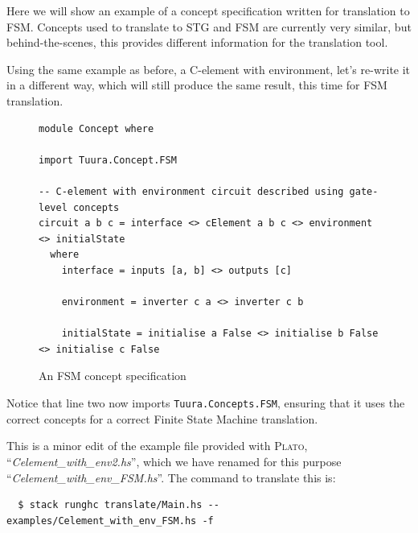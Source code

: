 \documentclass[british,technote,compsoc]{IEEEtran}
\newcommand{\noun}[1]{\textsc{#1}}
\begin{document}
Here we will show an example of a concept specification written for translation to FSM. Concepts used to translate to STG and FSM are currently very similar,
but behind-the-scenes, this provides different information for the translation tool. 

Using the same example as before, a C-element with environment, let's re-write it in a different way, which will still produce the same result, this time for FSM translation.

\begin{figure}[H]
\begin{centering}

\begin{verbatim}
module Concept where

import Tuura.Concept.FSM

-- C-element with environment circuit described using gate-level concepts
circuit a b c = interface <> cElement a b c <> environment <> initialState
  where
    interface = inputs [a, b] <> outputs [c]

    environment = inverter c a <> inverter c b

    initialState = initialise a False <> initialise b False <> initialise c False
\end{verbatim}

\par\end{centering}

\begin{centering}
\protect\caption{\label{fig:concepts_file}An FSM concept specification}

\par\end{centering}

\end{figure}

Notice that line two now imports \texttt{Tuura.Concepts.FSM}, ensuring that it uses the correct concepts for a correct Finite State Machine translation.

This is a minor edit of the example file provided with \noun{Plato}, ``\emph{Celement\_with\_env2.hs}'', which we have renamed for this purpose 
``\emph{Celement\_with\_env\_FSM.hs}''.
The command to translate this is:

\begin{verbatim}
  $ stack runghc translate/Main.hs -- examples/Celement_with_env_FSM.hs -f
\end{verbatim}
\end{document}

